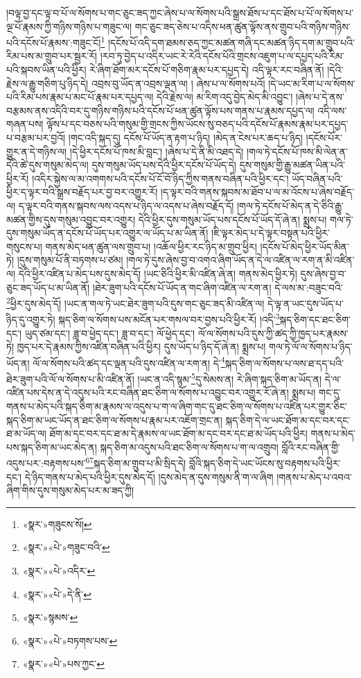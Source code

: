 །བལྟ་བྱ་དང་ལྟ་བ་པོ་ལ་སོགས་པ་གང་ཅུང་ཟད་ཀྱང་ཞེས་པ་ལ་སོགས་པའི་སྒྲས་ཐོས་པ་དང་ཐོས་པ་པོ་ལ་སོགས་པ་ལྔ་པོ་རྣམས་ཀྱི་གཉིས་གཉིས་པ་གཟུང་ལ། གང་ཅུང་ཟད་ཅེས་པ་འདིས་ཕན་ཚུན་ལྟོས་ནས་གྲུབ་པའི་གཉིས་གཉིས་པའི་དངོས་པོ་རྣམས་:གཟུང་ངོ།\footnote{«སྣར་»གཟུངས་སོ།} །དངོས་པོ་འདི་དག་ཐམས་ཅད་ཀྱང་མཚན་གཞི་དང་མཚན་ཉིད་དག་མ་གྲུབ་པའི་རིམ་པས་མ་གྲུབ་པར་སྦྱར་རོ། །རབ་ཏུ་བྱེད་པ་འདིར་ཡང་རེ་རེའི་དངོས་པོའི་གྲངས་འཇུག་པ་ལ་དཔྱད་པའི་རིམ་པའི་སྐབས་ཡིན་པའི་ཕྱིར། རེ་ཞིག་ཐོག་མར་དངོས་པོ་གཅིག་རྣམ་པར་དཔྱད་དེ། འདི་ལྟར་རང་བཞིན་ནོ། །དེའི་རྗེས་ལ་རྒྱུ་གཅིག་པུ་ཉིད་དེ། འབྲས་བུ་ཡོད་ན་འབྲས་ལྡན་ལ། །
ཞེས་པ་ལ་སོགས་པའོ། །དེ་ཡང་མ་རིག་པ་ལ་སོགས་པའི་རིམ་པས་རྣམ་པ་མང་པོ་རྣམ་པར་དཔྱད་ལ། དེའི་རྗེས་ལ། མ་རིག་འདུ་བྱེད་མེད་མི་འབྱུང་། །ཞེས་པ་དེ་ནས་བརྩམས་ནས་འདིའི་བར་དུ་གཉིས་གཉིས་པའི་དངོས་པོ་ཕན་ཚུན་ལྟོས་པས་གནས་པ་རྣམས་དཔྱད་ལ། འདི་ལས་གཞན་པས། ལྟོས་པ་དང་བཅས་པའི་གསུམ་གྱི་གྲངས་ཀྱིས་ཡོངས་སུ་བཅད་པའི་དངོས་པོ་རྣམས་རྣམ་པར་དཔྱད་པ་བརྩམ་པར་བྱའོ། །གང་འདི་སྐད་དུ། དངོས་པོ་ཡོད་ན་རྟག་པ་ཉིད། །མེད་ན་ངེས་པར་ཆད་པ་ཉིད། །དངོས་པོར་གྱུར་ན་དེ་གཉིས་ལ། །དེ་ཕྱིར་དངོས་པོ་ཁས་མི་བླང་། །ཞེས་པ་དེ་ནི་མི་འཐད་དེ། །གལ་ཏེ་དངོས་པོ་ཁས་མི་ལེན་ན་དེའི་ཚེ་དུས་གསུམ་མེད་ལ། དུས་གསུམ་ཡོད་པས་དེའི་ཕྱིར་དངོས་པོ་ཡོད་དེ། དུས་གསུམ་གྱི་རྒྱུ་མཚན་ཡིན་པའི་ཕྱིར་རོ། །འདིར་སྐྱེས་ལ་མ་འགགས་པའི་དངོས་པོ་ངོ་བོ་ཉིད་ཀྱིས་གནས་བཞིན་པའི་ཕྱིར་དང་། ཡོད་བཞིན་པའི་ཕྱིར་ད་ལྟར་བའི་སྒྲས་བརྗོད་པར་བྱ་བར་འགྱུར་རོ། །ད་ལྟར་བའི་གནས་སྐབས་མ་ཐོབ་པ་ལ་མ་འོངས་པ་ཞེས་བརྗོད་ལ། ད་ལྟར་བའི་གནས་སྐབས་ལས་འདས་པ་ཉིད་ལ་འདས་པ་ཞེས་བརྗོད་དོ། །གལ་ཏེ་དངོས་པོ་མེད་ན་དེ་ཅིའི་རྒྱུ་མཚན་གྱིས་དུས་གསུམ་འབྱུང་བར་འགྱུར། དེའི་ཕྱིར་དུས་གསུམ་ཡོད་པས་དངོས་པོ་ཡོད་དོ་ཞེ་ན། སྨྲས་པ། གལ་ཏེ་དུས་གསུམ་ཡོད་ན་དངོས་པོ་ཡོད་པར་འགྱུར་ལ་ཡོད་པ་མ་ཡིན་ནོ། །ཇི་ལྟར་མེད་པ་དེ་ལྟར་བསྟན་པའི་ཕྱིར་གསུངས་པ། གནས་མེད་ཕན་ཚུན་ལས་གྲུབ་པ། །འཆོལ་ཕྱིར་རང་ཉིད་མ་གྲུབ་ཕྱིར། །དངོས་པོ་མེད་ཕྱིར་ཡོད་མིན་ཏེ། །དུས་གསུམ་པོ་ནི་བཏགས་པ་ཙམ། །གལ་ཏེ་དུས་ཞེས་བྱ་བ་འགའ་ཞིག་ཡོད་ན་དེ་ལ་འཛིན་ལ་རག་ན་མི་འཛིན་ལ། དེའི་ཕྱིར་འཛིན་པ་མེད་པས་དུས་མེད་དོ། །ཡང་ཅིའི་ཕྱིར་མི་འཛིན་ཞེ་ན། གནས་མེད་ཕྱིར་ཏེ། དུས་ཞེས་བྱ་བ་ཅུང་ཟད་ཡོད་པ་མ་ཡིན་ནོ། །ཐེར་ཟུག་པའི་དངོས་པོ་ཡོད་ན་གང་ཞིག་འཛིན་ལ་རག་ན། དེ་ལས་མ་:བཟུང་བའི་\footnote{«སྣར་»«པེ་»གཟུང་བའི་}ཕྱིར་དུས་མེད་དོ། །ཡང་ན་གལ་ཏེ་ཡང་ཐེར་ཟུག་པའི་དུས་གང་ཅུང་ཟད་མི་འཛིན་ལ། དེ་ལྟ་ན་ཡང་དུས་ཡོད་པ་ཉིད་དུ་འགྱུར་ཏེ། སྐད་ཅིག་ལ་སོགས་པས་མངོན་པར་གསལ་བར་བྱས་པའི་ཕྱིར་རོ། །འདི་\footnote{«སྣར་»«པེ་»འདིར་}སྐད་ཅིག་དང་ཐང་ཅིག་དང་། ཡུད་ཙམ་དང་། ཟླ་བ་ཕྱེད་དང་། ཟླ་བ་དང་། ལོ་ཕྱེད་དང་། ལོ་ལ་སོགས་པའི་དུས་ཀྱི་ཚད་ཀྱི་ཁྱད་པར་རྣམས་ཏེ། ཁྱད་པར་དེ་རྣམས་ཀྱིས་འཛིན་བཞིན་པའི་ཕྱིར། དུས་ཡོད་པ་ཉིད་དོ་ཞེ་ན། སྨྲས་པ། གལ་ཏེ་ལོ་ལ་སོགས་པ་ཉིད་ཡོད་ན། ལོ་ལ་སོགས་པའི་ཚད་དང་ལྡན་པའི་དུས་འཛིན་ལ་རག་ན། དེ་\footnote{«སྣར་»«པེ་»དེ་ནི་}སྐད་ཅིག་ལ་སོགས་པ་ལས་ཐ་དད་པའི་ཐེར་ཟུག་པའི་ལོ་ལ་སོགས་པ་མི་འཛིན་ནོ། །ཡང་ན་འདི་སྙམ་\footnote{«སྣར་»སྙམས་}དུ་སེམས་ན། རེ་ཞིག་སྐད་ཅིག་མ་ཡོད་ན། དེ་ལ་འཛིན་པས་དེས་ན་དེ་འདུས་པའི་རང་བཞིན་ཐང་ཅིག་ལ་སོགས་པ་འབྱུང་བར་འགྱུར་རོ་ཞེ་ན། སྨྲས་པ། གང་དུ་གནས་པ་མེད་པའི་སྐད་ཅིག་མ་རྣམས་ལ་འདུས་པ་ག་ལ་ཞིག་གང་དུ་ཐང་ཅིག་ལ་སོགས་པ་འཛིན་པར་གྱུར་ཅིང་སྐད་ཅིག་མ་ཡང་ཡོད་ན་ཐང་ཅིག་ལ་སོགས་པ་རྣམ་པར་འཇོག་གྲང་ན། སྐད་ཅིག་དེ་ལ་ཡང་ཐོག་མ་དང་བར་དང་ཐ་མ་ཡོད་ལ། ཐོག་མ་དང་བར་དང་ཐ་མ་དེ་རྣམས་ལ་ཡང་ཐོག་མ་དང་བར་དང་ཐ་མ་ཡོད་པའི་ཕྱིར། གནས་པ་མེད་པས་སྐད་ཅིག་མ་ཡང་མེད་ན། སྐད་ཅིག་མ་འདུས་པའི་ཐང་ཅིག་ལ་སོགས་པ་ག་ལ་འགྲུབ། བློའི་རང་བཞིན་གྱི་འདུས་པར་:བརྟགས་པས་\footnote{«སྣར་»«པེ་»བཏགས་པས་}\footnote{«སྣར་»«པེ་»པས་ཀྱང་}སྐད་ཅིག་མ་གྲུབ་པ་མི་སྲིད་དེ། བློའི་སྐད་ཅིག་དེ་ཡང་ཡོངས་སུ་བརྟགས་པའི་ཕྱིར་དང་། དེ་ཉིད་གནས་པ་མེད་པའི་ཕྱིར་དུས་མེད་དོ། །དུས་མེད་ན་དུས་གསུམ་ནི་ག་ལ་ཞིག །གནས་པ་མེད་པ་འབའ་ཞིག་གིས་དུས་གསུམ་མེད་པར་མ་ཟད་ཀྱི། 